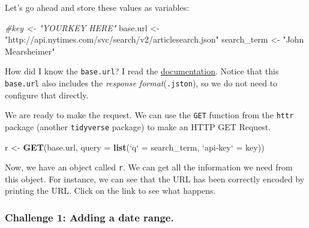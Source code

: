 \documentclass[
]{book}
\newenvironment{Shaded}{\begin{snugshade}}{\end{snugshade}}
\newcommand{\CommentTok}[1]{\textcolor[rgb]{0.56,0.35,0.01}{\textit{#1}}}
\newcommand{\DataTypeTok}[1]{\textcolor[rgb]{0.13,0.29,0.53}{#1}}
\newcommand{\KeywordTok}[1]{\textcolor[rgb]{0.13,0.29,0.53}{\textbf{#1}}}
\newcommand{\NormalTok}[1]{#1}
\newcommand{\OperatorTok}[1]{\textcolor[rgb]{0.81,0.36,0.00}{\textbf{#1}}}
\newcommand{\StringTok}[1]{\textcolor[rgb]{0.31,0.60,0.02}{#1}}
\begin{document}
Let's go ahead and store these values as variables:

\begin{Shaded}
\begin{Highlighting}[]
\CommentTok{#key <- "YOURKEY HERE"}
\NormalTok{base.url <-}\StringTok{ "http://api.nytimes.com/svc/search/v2/articlesearch.json"}
\NormalTok{search_term <-}\StringTok{ "John Mearsheimer"}
\end{Highlighting}
\end{Shaded}

How did I know the \texttt{base.url}? I read the \href{https://developer.nytimes.com/docs/articlesearch-product/1/routes/articlesearch.json/get}{documentation}. Notice that this \texttt{base.url} also includes the \emph{response format}(\texttt{.jston}), so we do not need to configure that directly.

We are ready to make the request. We can use the \texttt{GET} function from the \texttt{httr} package (another \texttt{tidyverse} package) to make an HTTP GET Request.

\begin{Shaded}
\begin{Highlighting}[]
\NormalTok{r <-}\StringTok{ }\KeywordTok{GET}\NormalTok{(base.url, }\DataTypeTok{query =} \KeywordTok{list}\NormalTok{(}\StringTok{`}\DataTypeTok{q}\StringTok{`}\NormalTok{ =}\StringTok{ }\NormalTok{search_term,}
                                \StringTok{`}\DataTypeTok{api-key}\StringTok{`}\NormalTok{ =}\StringTok{ }\NormalTok{key))}
\end{Highlighting}
\end{Shaded}

Now, we have an object called \texttt{r}. We can get all the information we need from this object. For instance, we can see that the URL has been correctly encoded by printing the URL. Click on the link to see what happens.

\begin{Shaded}
\end{Shaded}

\hypertarget{challenge-1-adding-a-date-range.}{%
\subsubsection*{Challenge 1: Adding a date range.}\label{challenge-1-adding-a-date-range.}}
\end{document}
